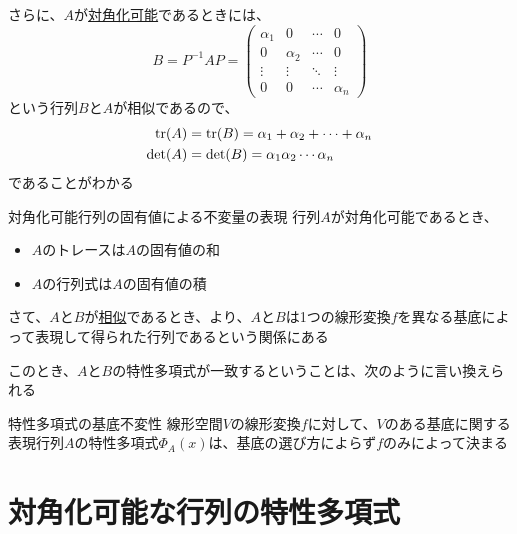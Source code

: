 \documentclass[../../../topic_linear-algebra]{subfiles}
\begin{document}
\br

さらに、$A$が\hyperref[def:diagonalizable]{対角化可能}であるときには、
\begin{equation*}
  B = P^{-1}AP = \begin{pmatrix}
    \alpha_1 & 0        & \cdots & 0        \\
    0        & \alpha_2 & \cdots & 0        \\
    \vdots   & \vdots   & \ddots & \vdots   \\
    0        & 0        & \cdots & \alpha_n
  \end{pmatrix}
\end{equation*}
という行列$B$と$A$が相似であるので、
\begin{align*}
  \tr(A)  & = \tr(B) = \alpha_1 + \alpha_2 + \cdots + \alpha_n \\
  \det(A) & = \det(B) = \alpha_1 \alpha_2 \cdots \alpha_n
\end{align*}
であることがわかる

\begin{theorem*}{対角化可能行列の固有値による不変量の表現}
  行列$A$が対角化可能であるとき、
  \begin{itemize}
    \item $A$のトレースは$A$の固有値の和
    \item $A$の行列式は$A$の固有値の積
  \end{itemize}
\end{theorem*}

\sectionline

さて、$A$と$B$が\hyperref[def:similar-matrices]{相似}であるとき、より、$A$と$B$は1つの線形変換$f$を異なる基底によって表現して得られた行列であるという関係にある

\br

このとき、$A$と$B$の特性多項式が一致するということは、次のように言い換えられる

\begin{theorem*}{特性多項式の基底不変性}
  線形空間$V$の線形変換$f$に対して、$V$のある基底に関する表現行列$A$の特性多項式$\Phi_A(x)$は、基底の選び方によらず$f$のみによって決まる
\end{theorem*}

\sectionline
\section{対角化可能な行列の特性多項式}
\end{document}
